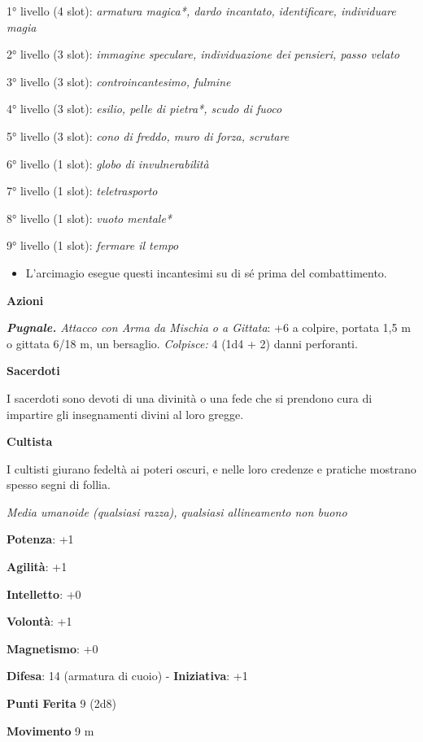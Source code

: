 \begin{multicols}{2}
1° livello (4 slot): \emph{armatura magica*, dardo incantato,}
\emph{identificare, individuare magia}

2° livello (3 slot): \emph{immagine speculare, individuazione dei}
\emph{pensieri, passo velato}

3° livello (3 slot): \emph{controincantesimo, fulmine}

4° livello (3 slot): \emph{esilio, pelle di pietra*, scudo di fuoco}

5° livello (3 slot): \emph{cono di freddo, muro di forza, scrutare}

6° livello (1 slot): \emph{globo di invulnerabilità}

7° livello (1 slot): \emph{teletrasporto}

8° livello (1 slot): \emph{vuoto mentale*}

9° livello (1 slot): \emph{fermare il tempo}


\begin{itemize}
\item
  L'arcimagio esegue questi incantesimi su di sé prima del
  combattimento.
\end{itemize}


\textbf{Azioni}

\emph{\textbf{Pugnale.} Attacco con Arma da Mischia o a Gittata}: +6 a
colpire, portata 1,5 m o gittata 6/18 m, un bersaglio. \emph{Colpisce:}
4 (1d4 + 2) danni perforanti.


\textbf{Sacerdoti}

I sacerdoti sono devoti di una divinità o una fede che si prendono cura
di impartire gli insegnamenti divini al loro gregge.

\textbf{Cultista}

I cultisti giurano fedeltà ai poteri oscuri, e nelle loro credenze e
pratiche mostrano spesso segni di follia.

\emph{Media umanoide (qualsiasi razza), qualsiasi allineamento non
buono}

\textbf{Potenza}: +1

\textbf{Agilità}: +1

\textbf{Intelletto}: +0

\textbf{Volontà}: +1

\textbf{Magnetismo}: +0

\textbf{Difesa}: 14 (armatura di cuoio) - \textbf{Iniziativa}: +1

\textbf{Punti Ferita} 9 (2d8)

\textbf{Movimento} 9 m


\end{multicols}
